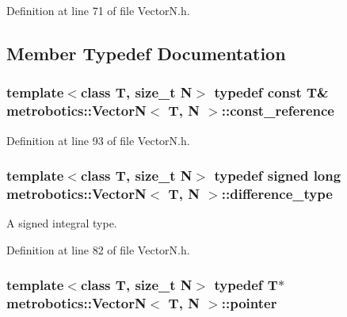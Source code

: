 \-Definition at line 71 of file \-Vector\-N.\-h.



\subsection{\-Member \-Typedef \-Documentation}
\hypertarget{classmetrobotics_1_1VectorN_a965e5b1a579964b6dea58326f3768bc6}{
\subsubsection[{const\-\_\-reference}]{\setlength{\rightskip}{0pt plus 5cm}template$<$class \-T, size\-\_\-t \-N$>$ typedef const \-T\& {\bf metrobotics\-::\-Vector\-N}$<$ \-T, \-N $>$\-::{\bf const\-\_\-reference}}}\label{classmetrobotics_1_1VectorN_a965e5b1a579964b6dea58326f3768bc6}


\-Definition at line 93 of file \-Vector\-N.\-h.

\hypertarget{classmetrobotics_1_1VectorN_a5e2e39044c62f6334d9ca146207f2bce}{
\subsubsection[{difference\-\_\-type}]{\setlength{\rightskip}{0pt plus 5cm}template$<$class \-T, size\-\_\-t \-N$>$ typedef signed long {\bf metrobotics\-::\-Vector\-N}$<$ \-T, \-N $>$\-::{\bf difference\-\_\-type}}}\label{classmetrobotics_1_1VectorN_a5e2e39044c62f6334d9ca146207f2bce}


\-A signed integral type. 



\-Definition at line 82 of file \-Vector\-N.\-h.

\hypertarget{classmetrobotics_1_1VectorN_ac6ad8aadcbd2fbeecde5b48f441be4c9}{
\subsubsection[{pointer}]{\setlength{\rightskip}{0pt plus 5cm}template$<$class \-T, size\-\_\-t \-N$>$ typedef \-T$\ast$ {\bf metrobotics\-::\-Vector\-N}$<$ \-T, \-N $>$\-::{\bf pointer}}}\label{classmetrobotics_1_1VectorN_ac6ad8aadcbd2fbeecde5b48f441be4c9}


